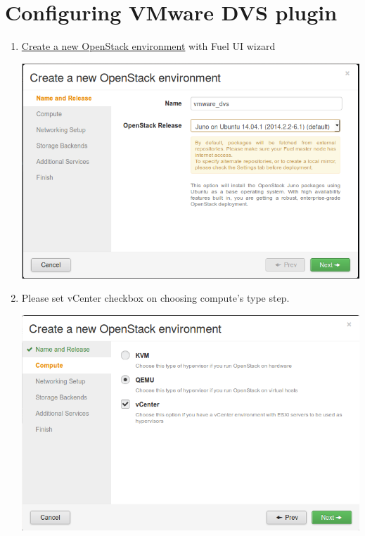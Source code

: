 \documentclass{article}
\begin{document}
\newpage

\section{Configuring VMware DVS plugin}

\begin{enumerate}

\item \href{https://docs.mirantis.com/openstack/fuel/fuel-6.1/user-guide.html#create-a-new-openstack-environment}{Create a new OpenStack environment} with Fuel UI wizard

\includegraphics[scale=0.75]{pics/create}

\item Please set vCenter checkbox on choosing compute's type step.

\includegraphics[scale=0.75]{pics/compute}

\newpage


\end{enumerate}
\end{document}
